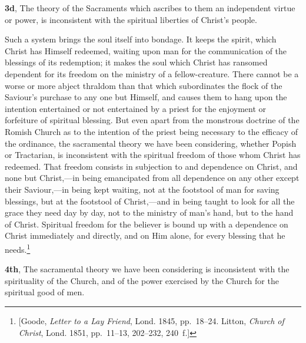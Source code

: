 \documentclass[
]{book}
\begin{document}
\textbf{3d}, The theory of the Sacraments which ascribes to them an independent virtue or power, is inconsistent with the spiritual liberties of Christ's people.

Such a system brings the soul itself into bondage. It keeps the spirit, which Christ has Himself redeemed, waiting upon man for the communication of the blessings of its redemption; it makes the soul which Christ has ransomed dependent for its freedom on the ministry of a fellow-creature. There cannot be a worse or more abject thraldom than that which subordinates the flock of the Saviour's purchase to any one but Himself, and causes them to hang upon the intention entertained or not entertained by a priest for the enjoyment or forfeiture of spiritual blessing. But even apart from the monstrous doctrine of the Romish Church as to the intention of the priest being necessary to the efficacy of the ordinance, the sacramental theory we have been considering, whether Popish or Tractarian, is inconsistent with the spiritual freedom of those whom Christ has redeemed. That freedom consists in subjection to and dependence on Christ, and none but Christ,---in being emancipated from all dependence on any other except their Saviour,---in being kept waiting, not at the footstool of man for saving blessings, but at the footstool of Christ,---and in being taught to look for all the grace they need day by day, not to the ministry of man's hand, but to the hand of Christ. Spiritual freedom for the believer is bound up with a dependence on Christ immediately and directly, and on Him alone, for every blessing that he needs.\footnote{{[}Goode, \emph{Letter to a Lay Friend}, Lond. 1845, pp.~18--24. Litton, \emph{Church of Christ}, Lond. 1851, pp.~11--13, 202--232, 240~f.{]}}

\textbf{4th}, The sacramental theory we have been considering is inconsistent with the spirituality of the Church, and of the power exercised by the Church for the spiritual good of men.
\end{document}
